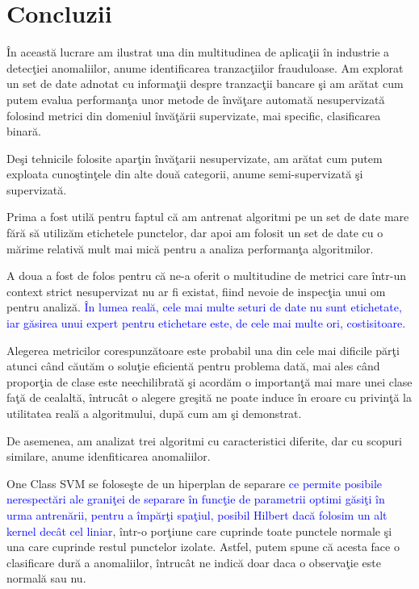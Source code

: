 \chapter{Concluzii}

În această lucrare am ilustrat una din multitudinea de aplicaţii în industrie a 
detecţiei anomaliilor, anume identificarea tranzacţiilor frauduloase. Am explorat un 
set de date adnotat cu informaţii despre tranzacţii bancare şi am arătat cum putem evalua
performanţa unor metode de învăţare automată nesupervizată folosind metrici din domeniul 
învăţării supervizate, mai specific, clasificarea binară.

Deşi tehnicile folosite aparţin învăţarii nesupervizate, am arătat cum putem exploata
cunoştinţele din alte două categorii, anume semi-supervizată şi supervizată. 

Prima a fost 
utilă pentru faptul că am antrenat algoritmi pe un set de date mare fără să utilizăm 
etichetele punctelor, dar apoi am folosit un set de date cu o mărime relativă mult mai mică
pentru a analiza performanţa algoritmilor. 

A doua a fost de folos pentru că ne-a oferit 
o multitudine de metrici care într-un context strict nesupervizat nu ar fi existat, fiind 
nevoie de inspecţia unui om pentru analiză. \textcolor{blue}{În lumea reală, cele mai multe seturi de date
nu sunt etichetate, iar găsirea unui expert pentru etichetare este, 
de cele mai multe ori,
costisitoare.}

Alegerea metricilor corespunzătoare
este probabil una din cele mai dificile părţi atunci când căutăm o soluţie eficientă pentru 
problema dată, mai ales când proporţia de clase este neechilibrată şi acordăm o importanţă mai 
mare unei clase faţă de cealaltă, întrucât o alegere greşită ne poate induce în eroare cu privinţă
la utilitatea reală a algoritmului, după cum am şi demonstrat.

De asemenea, am analizat trei algoritmi cu caracteristici diferite, dar cu 
scopuri similare, anume idenfiticarea anomaliilor.

One Class SVM se 
foloseşte de un hiperplan de separare \textcolor{blue}{
ce permite posibile nerespectări ale graniţei
de separare în funcţie de parametrii optimi găsiţi în urma antrenării,
pentru a împărţi spaţiul, posibil Hilbert dacă folosim un alt kernel decât cel 
liniar}, într-o porţiune 
care cuprinde toate punctele normale şi una care cuprinde restul punctelor izolate. Astfel,
putem spune că acesta face o clasificare dură a anomaliilor, întrucât ne indică doar daca
o observaţie este normală sau nu. 

